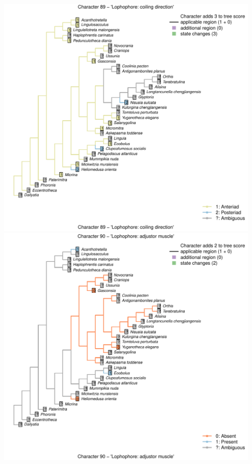 \documentclass[]{book}
\theoremstyle{definition}
\theoremstyle{definition}
\theoremstyle{definition}
\theoremstyle{remark}
\begin{document}
\includegraphics{Brachiopod_phylogeny_files/figure-latex/unnamed-chunk-4-89.pdf}
\includegraphics{Brachiopod_phylogeny_files/figure-latex/unnamed-chunk-4-90.pdf}
\end{document}
